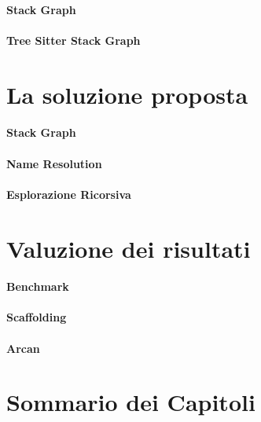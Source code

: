 \paragraph{Stack Graph}

\paragraph{Tree Sitter Stack Graph}

\section{La soluzione proposta}

\paragraph{Stack Graph}

\paragraph{Name Resolution}

\paragraph{Esplorazione Ricorsiva}

\section{Valuzione dei risultati}

\paragraph{Benchmark}

\paragraph{Scaffolding}

\paragraph{Arcan}

\section{Sommario dei Capitoli}
